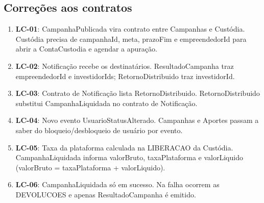 \subsection{Correções aos contratos}
\begin{enumerate}
  \item \textbf{LC-01}: CampanhaPublicada vira contrato entre Campanhas e Custódia. Custódia precisa de campanhaId, meta, prazoFim e empreendedorId para abrir a ContaCustodia e agendar a apuração.
  \item \textbf{LC-02}: Notificação recebe os destinatários. ResultadoCampanha traz empreendedorId e investidorIds; RetornoDistribuido traz investidorId.
  \item \textbf{LC-03}: Contrato de Notificação lista RetornoDistribuido. RetornoDistribuido substitui CampanhaLiquidada no contrato de Notificação.
  \item \textbf{LC-04}: Novo evento UsuarioStatusAlterado. Campanhas e Aportes passam a saber do bloqueio/desbloqueio de usuário por evento.
  \item \textbf{LC-05}: Taxa da plataforma calculada na LIBERACAO da Custódia. CampanhaLiquidada informa valorBruto, taxaPlataforma e valorLiquido (valorBruto = taxaPlataforma + valorLiquido).
  \item \textbf{LC-06}: CampanhaLiquidada só em sucesso. Na falha ocorrem as DEVOLUCOES e apenas ResultadoCampanha é emitido.
\end{enumerate}
